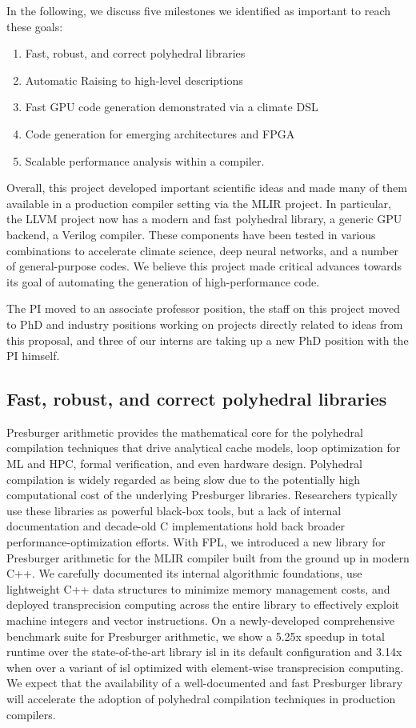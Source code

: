\documentclass[11pt, manuscript,\review anonymous]{acmart}
\begin{document}
In the following, we discuss five milestones we identified as important to
reach these goals:

\begin{enumerate}
\item Fast, robust, and correct polyhedral libraries
\item Automatic Raising to high-level descriptions
\item Fast GPU code generation demonstrated via a climate DSL
\item Code generation for emerging architectures and FPGA
\item Scalable performance analysis within a compiler.
\end{enumerate}

Overall, this project developed important scientific ideas and made many of
them available in a production compiler setting via the MLIR project. In
particular, the LLVM project now has a modern and fast polyhedral library,
a generic GPU backend, a Verilog compiler. These components have been
tested in various combinations to accelerate climate science, deep neural
networks, and a number of general-purpose codes. We believe this project
made critical advances towards its goal of automating the generation
of high-performance code.

The PI moved to an associate professor position, the staff on this project
moved to PhD and industry positions working on projects directly related
to ideas from this proposal, and three of our interns are taking up a
new PhD position with the PI himself.


\subsection{Fast, robust, and correct polyhedral libraries}
Presburger arithmetic provides the mathematical core for the polyhedral
compilation techniques that drive analytical cache models, loop optimization
for ML and HPC, formal verification, and even hardware design.  Polyhedral
compilation is widely regarded as being slow due to the potentially high
computational cost of the underlying Presburger libraries. Researchers
typically use these libraries as powerful black-box tools, but a lack of
internal documentation and decade-old C implementations hold back broader
performance-optimization efforts. With FPL, we introduced a new library for
Presburger arithmetic for the MLIR compiler built from the ground up in modern
C++. We carefully documented its internal algorithmic foundations, use
lightweight C++ data structures to minimize memory management costs, and deployed
transprecision computing across the entire library to effectively exploit
machine integers and vector instructions. On a newly-developed comprehensive
benchmark suite for Presburger arithmetic, we show a 5.25x speedup in total
runtime over the state-of-the-art library isl in its default configuration and
3.14x when over a variant of isl optimized with element-wise transprecision
computing. We expect that the availability of a well-documented and fast
Presburger library will accelerate the adoption of polyhedral compilation
techniques in production compilers.
\end{document}
